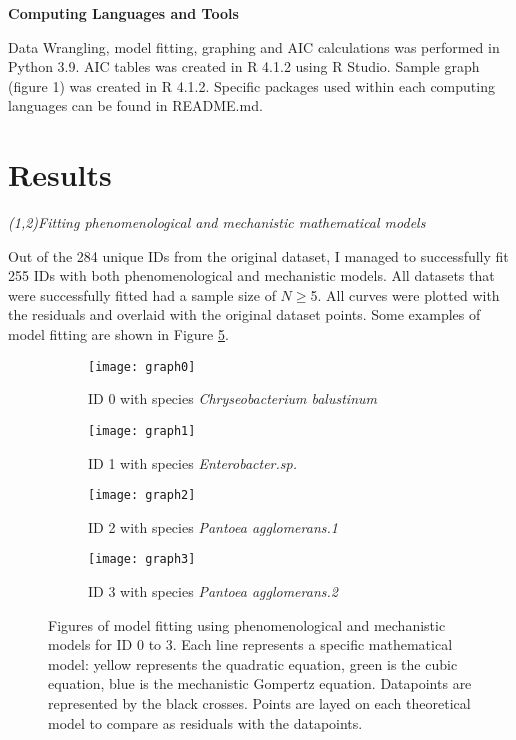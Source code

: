 \documentclass[11pt]{article}
\begin{document}
\noindent\textbf{Computing Languages and Tools}

Data Wrangling, model fitting, graphing and AIC calculations was performed in Python 3.9. AIC tables was created in R 4.1.2 
using R Studio. Sample graph (figure 1) was created in R 4.1.2. Specific packages used within each computing languages can 
be found in README.md.

\section{Results}

\noindent\emph{(1,2)Fitting phenomenological and mechanistic mathematical models}

Out of the 284 unique IDs from the original dataset, I managed to successfully fit 255 IDs with both phenomenological and mechanistic
models. All datasets that were successfully fitted had a sample size of $N\geq$5. All curves were plotted with the residuals and 
overlaid with the original dataset points. Some examples of model fitting are shown in Figure \ref{fig:fig2}.

\begin{figure}[ht]
    \begin{subfigure}[b]{0.5\linewidth}
        \centering
        \texttt{[image: graph0]}
        \caption{ID 0 with species \emph{Chryseobacterium balustinum} \cite{bae_growth_2014}}
        \label{fig2:a}
        \vspace{4ex}
    \end{subfigure}%
    \begin{subfigure}[b]{0.5\linewidth}
        \centering
        \texttt{[image: graph1]}
        \caption{ID 1 with species \emph{Enterobacter.sp.} \cite{bae_growth_2014}}
        \label{fig2:b}
        \vspace{4ex}
    \end{subfigure}
    \begin{subfigure}[b]{0.5\linewidth}
        \centering
        \texttt{[image: graph2]}
        \caption{ID 2 with species \emph{Pantoea agglomerans.1} \cite{bae_growth_2014}}
        \label{fig2:c}
        \vspace{4ex}
    \end{subfigure}%
    \begin{subfigure}[b]{0.5\linewidth}
        \centering
        \texttt{[image: graph3]}
        \caption{ID 3 with species \emph{Pantoea agglomerans.2} \cite{bae_growth_2014}}
        \label{fig2:d}
        \vspace{4ex}  
    \end{subfigure}
    \caption{Figures of model fitting using phenomenological and mechanistic models for ID 0 to 3. Each line represents a specific mathematical model: yellow represents the quadratic equation,
    green is the cubic equation, blue is the mechanistic Gompertz equation. Datapoints are represented by the black crosses. Points are layed on each theoretical model to compare as residuals with the datapoints.}
    \label{fig:fig2}
\end{figure}
\end{document}
